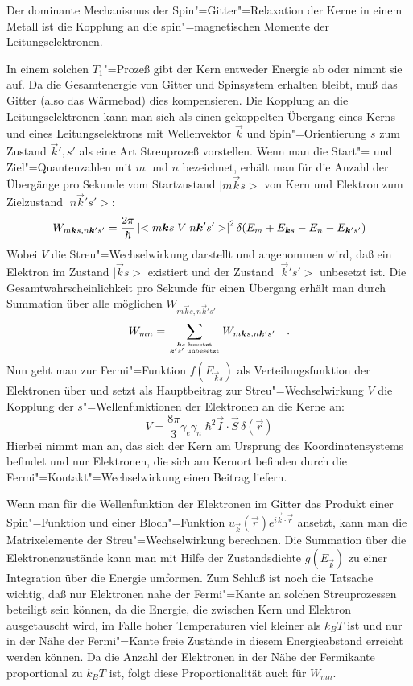 Der dominante Mechanismus der Spin"=Gitter"=Relaxation der Kerne in einem Metall ist die Kopplung an
die spin"=magnetischen Momente der Leitungselektronen.

In einem solchen $T_1$"=Prozeß gibt der Kern entweder Energie ab oder nimmt sie auf. Da die
Gesamtenergie von Gitter und Spinsystem erhalten bleibt, muß das Gitter (also das Wärmebad) dies
kompensieren. Die Kopplung an die Leitungselektronen kann man sich als einen gekoppelten Übergang
eines Kerns und eines Leitungselektrons mit Wellenvektor $\vec k$ und Spin"=Orientierung
$s$ zum Zustand $\vec k', s'$ als eine Art Streuprozeß vorstellen. Wenn man die Start"=
und Ziel"=Quantenzahlen mit $m$ und $n$ bezeichnet, erhält man für die Anzahl der Übergänge pro
Sekunde vom Startzustand $|m\vec ks>$ von Kern und Elektron zum Zielzustand $|n\vec k's'>$:
	\begin{equation}
		W_{m\vec ks, n\vec k's'}=
			\frac{2\pi}{\hbar}\abs{<m\vec ks|V|n\vec k's'>}^2\delta(E_m+E_{\vec ks}-E_n-E_{\vec k's'})
	\end{equation}
Wobei $V$ die Streu"=Wechselwirkung darstellt und angenommen wird, daß ein Elektron im Zustand
$|\vec ks>$ existiert und der Zustand $|\vec k's'>$ unbesetzt ist. Die Gesamtwahrscheinlichkeit
pro Sekunde für einen Übergang erhält man durch Summation über alle möglichen $W_{m\vec ks, n\vec
k's'}$
	\begin{equation}
		W_{mn}=\sum_{\bm k s \text{ besetzt}\atop\bm k's'\text{ unbesetzt}}W_{m\bm ks, n\bm k's'}\quad\text{.}
	\end{equation}
Nun geht man zur Fermi"=Funktion $f(E_{\vec ks})$ als Verteilungsfunktion der Elektronen über und
setzt als Hauptbeitrag zur Streu"=Wechselwirkung $V$ die Kopplung der $s$"=Wellenfunktionen der
Elektronen an die Kerne an:
	\begin{equation}
		V=\frac{8\pi}{3}\gamma_e\gamma_n\;\hbar^2\vec I\cdot\vec S\,\delta(\vec r)
	\end{equation}
Hierbei nimmt man an, das sich der Kern am Ursprung des Koordinatensystems befindet und nur
Elektronen, die sich am Kernort befinden durch die Fermi"=Kontakt"=Wechselwirkung einen
Beitrag liefern.

Wenn man für die Wellenfunktion der Elektronen im Gitter das Produkt einer Spin"=Funktion und einer
Bloch"=Funktion $u_{\vec k}(\vec r)e^{i\vec k\cdot\vec r}$ ansetzt, kann man die Matrixelemente der
Streu"=Wechselwirkung berechnen. Die Summation über die Elektronenzustände kann man mit Hilfe der
Zustandsdichte $g(E_{\vec k})$ zu einer Integration über die Energie umformen. Zum Schluß ist noch
die Tatsache wichtig, daß nur Elektronen nahe der Fermi"=Kante an solchen Streuprozessen beteiligt
sein können, da die Energie, die zwischen Kern und Elektron ausgetauscht wird, im Falle hoher
Temperaturen viel kleiner als $k_BT$ ist und nur in der Nähe der Fermi"=Kante freie Zustände in
diesem Energieabstand erreicht werden können. Da die Anzahl der Elektronen in der Nähe der
Fermikante proportional zu $k_BT$ ist, folgt diese Proportionalität auch für $W_{mn}$.

